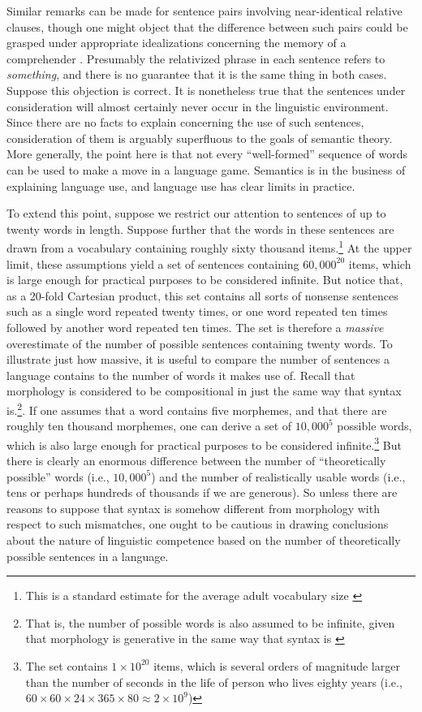 Similar remarks can be made for sentence pairs involving near-identical relative clauses, though one might object that the difference between such pairs could be grasped under appropriate idealizations concerning the memory of a comprehender \citep{FodorPylyshyn:1988}. Presumably the relativized phrase in each sentence refers to \textit{something}, and there is no guarantee that it is the same thing in both cases. Suppose this objection is correct. It is nonetheless true that the sentences under consideration will almost certainly never occur in the linguistic environment. Since there are no facts to explain concerning the use of such sentences, consideration of them is arguably superfluous to the goals of semantic theory. More generally, the point here is that not every ``well-formed'' sequence of words can be used to make a move in a language game. Semantics is in the business of explaining language use, and language use has clear limits in practice.

To extend this point, suppose we restrict our attention to sentences of up to twenty words in length. Suppose further that the words in these sentences are drawn from a vocabulary containing roughly sixty thousand items.\footnote{This is a standard estimate for the average adult vocabulary size \citep{Pinker:1994,Harley:2014}} At the upper limit, these assumptions yield a set of sentences containing $60,000^{20}$ items, which is large enough for practical purposes to be considered infinite. But notice that, as a 20-fold Cartesian product, this set contains all sorts of nonsense sentences such as a single word repeated twenty times, or one word repeated ten times followed by another word repeated ten times. The set is therefore a \textit{massive} overestimate of the number of possible sentences containing twenty words. To illustrate just how massive, it is useful to compare the number of sentences a language contains to the number of words it makes use of. Recall that morphology is considered to be compositional in just the same way that syntax is.\footnote{That is, the number of possible words is also assumed to be infinite, given that morphology is generative in the same way that syntax is \citep{Pinker:1994}}. If one assumes that a word contains five morphemes, and that there are roughly ten thousand morphemes, one can derive a set of $10,000^{5}$ possible words, which is also large enough for practical purposes to be considered infinite.\footnote{The set contains $1 \times 10^{20}$ items, which is several orders of magnitude larger than the number of seconds in the life of person who lives eighty years (i.e., $60 \times 60 \times 24 \times 365 \times 80 \approx 2 \times 10^{9}$)} But there is clearly an enormous difference between the number of ``theoretically possible'' words (i.e., $10,000^{5}$) and the number of realistically usable words (i.e., tens or perhaps hundreds of thousands if we are generous). So unless there are reasons to suppose that syntax is somehow different from morphology with respect to such mismatches, one ought to be cautious in drawing conclusions about the nature of linguistic competence based on the number of theoretically possible sentences in a language.

